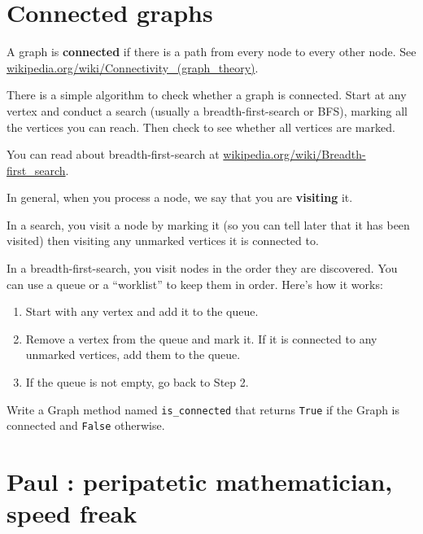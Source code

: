 \documentclass[10pt]{book}
\begin{document}
\section{Connected graphs}
\label{bfs}

A graph is {\bf connected} if there is a path from every node to every
other node.  See \url{wikipedia.org/wiki/Connectivity_(graph_theory)}.

There is a simple algorithm to check whether a graph is connected.
Start at any vertex and conduct a search
(usually a breadth-first-search or BFS), marking all the vertices you
can reach.  Then check to see whether all vertices are marked.

You can read about breadth-first-search at
\url{wikipedia.org/wiki/Breadth-first_search}.  

In general, when you process
a node, we say that you are 
{\bf visiting} it.

In a search, you visit a node
by marking it (so you can tell later that it has been visited)
then visiting any
unmarked vertices it is connected to.

In a breadth-first-search, you visit nodes in the order they are
discovered.  You can use a queue or a ``worklist'' to keep them in
order.  Here's how it works:

\begin{enumerate}

\item Start with any vertex and add it to the queue.

\item Remove a vertex from the queue and mark it.  If it is
connected to any unmarked vertices, add them to the queue.

\item If the queue is not empty, go back to Step 2.

\end{enumerate}

\begin{ex}

Write a Graph method named \verb"is_connected" that returns
{\tt True} if the Graph is connected and {\tt False} otherwise.

\end{ex}


\section{Paul \Erdos: peripatetic mathematician, speed freak}
\end{document}
